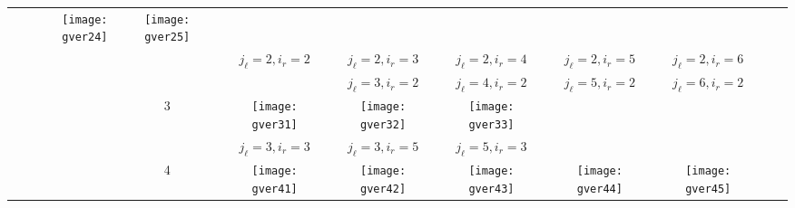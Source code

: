 \documentclass[12pt]{article}
\theoremstyle{definition}
\theoremstyle{remark}
\begin{document}
\begin{table}
{\begin{tabular}{ r|c|c|c|c|c|c|c|c| }
\begin{minipage}{.20\textwidth}
\texttt{[image: gver24]}
\end{minipage} & \begin{minipage}{.20\textwidth}
\texttt{[image: gver25]}
\end{minipage}    \\
\cline{3-7}
&  & $j_{\ell}=2,i_r=2$ & $j_{\ell}=2,i_r=3$ & $j_{\ell}=2,i_r=4$ & $j_{\ell}=2,i_r=5$ & $j_{\ell}=2,i_r=6$   \\
\cline{3-7}
&  & & $j_{\ell}=3,i_r=2$ & $j_{\ell}=4,i_r=2$ & $j_{\ell}=5,i_r=2$ & $j_{\ell}=6,i_r=2$   \\
\cline{2-7}
& 3 & \begin{minipage}{.20\textwidth}\vspace{2mm}
	\texttt{[image: gver31]}\vspace{2mm}
\end{minipage} & \begin{minipage}{.20\textwidth}
\texttt{[image: gver32]}
\end{minipage} & \begin{minipage}{.20\textwidth}
\texttt{[image: gver33]}
\end{minipage} &  &    \\
\cline{3-7}
&  & $j_{\ell}=3,i_r=3$ & $j_{\ell}=3,i_r=5$ & $j_{\ell}=5,i_r=3$ & &    \\
\cline{2-7}
& 4 & \begin{minipage}{.20\textwidth}\vspace{2mm}
	\texttt{[image: gver41]}\vspace{2mm}
\end{minipage} & \begin{minipage}{.20\textwidth}
\texttt{[image: gver42]}
\end{minipage} & \begin{minipage}{.20\textwidth}
\texttt{[image: gver43]}
\end{minipage} & \begin{minipage}{.20\textwidth}
\texttt{[image: gver44]}
\end{minipage} & \begin{minipage}{.20\textwidth}
\texttt{[image: gver45]}
\end{minipage}    \\

\end{tabular}}
\end{table}
\end{document}
